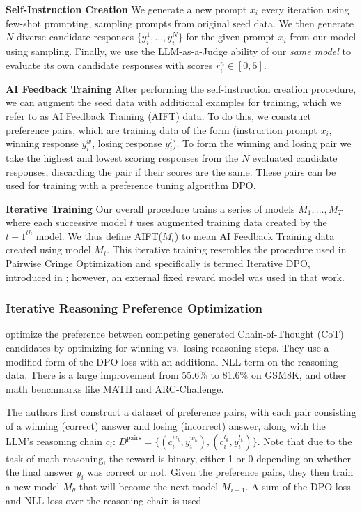 \vspace{1em}
\textbf{Self-Instruction Creation} We generate a new prompt $x_i$ every iteration using few-shot prompting, sampling prompts from original seed data. We then generate $N$ diverse candidate responses $\{y^1_i, ..., y^N_i\}$ for the given prompt $x_i$ from our model using sampling. Finally, we use the LLM-as-a-Judge ability of our \textit{same model} to evaluate its own candidate responses with scores $r^n_i \in [0, 5]$.

\vspace{1em}
\textbf{AI Feedback Training}
After performing the self-instruction creation procedure, we can augment the seed data with additional examples for training, which we refer to as AI Feedback Training (AIFT) data. To do this, we construct preference pairs, which are training data of the form (instruction prompt $x_i$, winning response $y^w_i$, losing response $y^l_i$). To form the winning and losing pair we take the highest and lowest scoring responses from the $N$ evaluated candidate responses, discarding the pair if their scores are the same. These pairs can be used for training with a preference tuning algorithm DPO.

\vspace{1em}
\textbf{Iterative Training}
Our overall procedure trains a series of models $M_1, ..., M_T$ where each successive model $t$ uses augmented training data created by the $t-1^{th}$ model. We thus define AIFT($M_t$) to mean AI Feedback Training data created using model $M_t$. This iterative training resembles the procedure used in Pairwise Cringe Optimization and specifically is termed Iterative DPO, introduced in \autocite{xu2024thingscringeothersiterative}; however, an external fixed reward model was used in that work.

\subsubsection{Iterative Reasoning Preference Optimization}

\autocite{pang2024iterativereasoningpreferenceoptimization} optimize the preference between competing generated Chain-of-Thought (CoT) candidates by optimizing for winning vs.\ losing reasoning steps. They use a modified form of the DPO loss with an additional NLL term on the reasoning data. There is a large improvement from 55.6\% to 81.6\% on GSM8K, and other math benchmarks like MATH and ARC-Challenge.

The authors first construct a dataset of preference pairs, with each pair consisting of a winning (correct) answer and losing (incorrect) answer, along with the LLM's reasoning chain $c_i$: $D^{\text{pairs}} = \{(c_i^{w_k}, y_i^{w_k}), (c_i^{l_k}, y_i^{l_k})\}$. Note that due to the task of math reasoning, the reward is binary, either 1 or 0 depending on whether the final answer $y_i$ was correct or not. Given the preference pairs, they then train a new model $M_\theta$ that will become the next model $M_{i+1}$. A sum of the DPO loss and NLL loss over the reasoning chain is used

